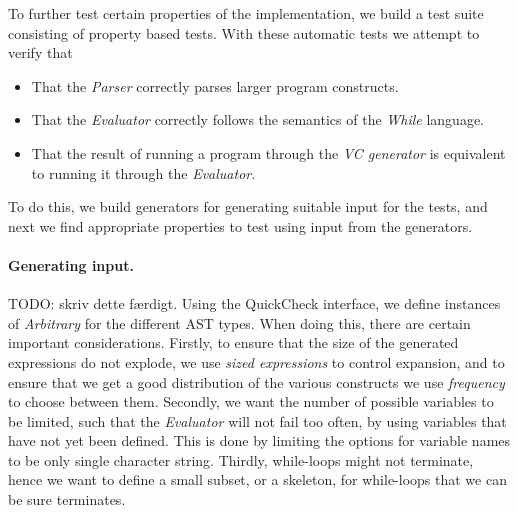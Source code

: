 To further test certain properties of the implementation, we build a test suite consisting of property based tests.
With these automatic tests we attempt to verify that
\begin{itemize}
	\item That the \textit{Parser} correctly parses larger program constructs.
	\item That the \textit{Evaluator} correctly follows the semantics of the \textit{While} language. 
	\item That the result of running a program through the \textit{VC generator} is equivalent to running it through the \textit{Evaluator}.
\end{itemize}
To do this, we build generators for generating suitable input for the tests, and next we find appropriate properties to test using input from the generators.

\paragraph{Generating input.}
TODO: skriv dette færdigt.
Using the QuickCheck interface, we define instances of \textit{Arbitrary} for the different AST types.
When doing this, there are certain important considerations.
Firstly, to ensure that the size of the generated expressions do not explode, we use \textit{sized expressions} to control expansion, and to ensure that we get a good distribution of the various constructs we use \textit{frequency} to choose between them.
Secondly, we want the number of possible variables to be limited, such that the \textit{Evaluator} will not fail too often, by using variables that have not yet been defined. This is done by limiting the options for variable names to be only single character string.
Thirdly, while-loops might not terminate, hence we want to define a small subset, or a skeleton, for while-loops that we can be sure terminates. 

